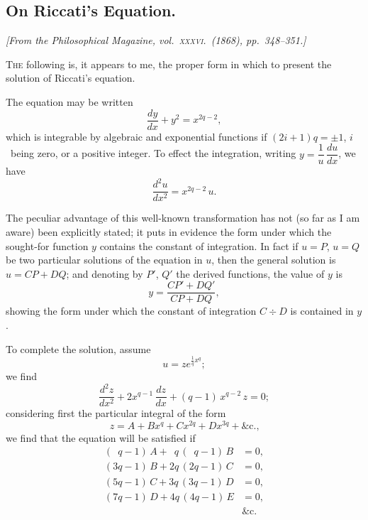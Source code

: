 \documentclass[11pt,a4paper]{article}
\begin{document}
\subsection*{On Riccati's Equation.}

\begin{center}
\textit{[From the Philosophical Magazine, vol.~\textsc{xxxvi}.\ (1868), pp.~348--351.]}
\end{center}

\textsc{The} following is, it appears to me, the proper form in which to present
the solution of Riccati's equation.

The equation may be written
\[
\frac{dy}{dx} + y^2 = x^{2q-2},
\]
which is integrable by algebraic and exponential functions if $(2i+1)q = \pm 1$,
$i$~being zero, or a positive integer.  To effect the integration, writing
$y = \dfrac{1}{u}\,\dfrac{du}{dx}$, we have
\[
\frac{d^2u}{dx^2} = x^{2q-2}\,u.
\]

The peculiar advantage of this well-known transformation has not (so far as I
am aware) been explicitly stated; it puts in evidence the form under which the
sought-for function $y$ contains the constant of integration.  In fact if
$u = P$, $u = Q$ be two particular solutions of the equation in $u$, then the
general solution is $u = CP + DQ$; and denoting by $P'$, $Q'$ the derived
functions, the value of $y$ is
\[
y = \frac{CP' + DQ'}{CP + DQ},
\]
showing the form under which the constant of integration $C \div D$ is
contained in $y$.

To complete the solution, assume
\[
u = z e^{\frac{1}{q}x^q};
\]
we find
\[
\frac{d^2z}{dx^2} + 2 x^{q-1}\,\frac{dz}{dx} + (q-1)\,x^{q-2}\,z = 0;
\]
considering first the particular integral of the form
\[
z = A + B x^q + C x^{2q} + D x^{3q} + \&\text{c.,}
\]
we find that the equation will be satisfied if
\begin{align*}
(\phantom{1}q-1)\,A + \phantom{1}q\,(\phantom{1}q-1)\,B &= 0, \\
(3q-1)\,B + 2q\,(2q-1)\,C &= 0, \\
(5q-1)\,C + 3q\,(3q-1)\,D &= 0, \\
(7q-1)\,D + 4q\,(4q-1)\,E &= 0, \\
&\&\text{c.}
\end{align*}
\end{document}
